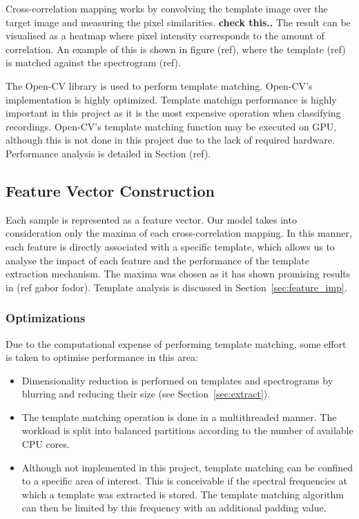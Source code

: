 Cross-correlation mapping works by convolving the template image
over the target image and measuring the pixel similarities.
\textbf{check this..}
The result can be visualised as a heatmap where pixel intensity corresponds to
the amount of correlation.
An example of this is shown in figure (ref), where the template (ref) is matched
against the spectrogram (ref).

The Open-CV library is used to perform template matching.
Open-CV's implementation is highly optimized.
Template matchign performance is highly important in this project as it is the
most expensive operation when classifying recordings.
Open-CV's template matching function may be executed on GPU, although this is
not done in this project due to the lack of required hardware.
Performance analysis is detailed in Section (ref).

\subsection{Feature Vector Construction}
Each sample is represented as a feature vector.
Our model takes into consideration only the maxima of each cross-correlation
mapping.
In this manner, each feature is directly associated with a specific template,
which allows us to analyse the impact of each feature and the performance of the
template extraction mechanism.
The maxima was chosen as it has shown promising results in (ref gabor fodor).
Template analysis is discussed in Section~\ref{sec:feature_imp}.

\subsubsection{Optimizations}
Due to the computational expense of performing template matching, some effort is
taken to optimise performance in this area:

\begin{itemize}
  \item Dimensionality reduction is performed on templates and spectrograms by
blurring and reducing their size (see Section~\ref{sec:extract}).

  \item The template matching operation is done in a multithreaded manner.
The workload is split into balanced partitions according to the number of
available CPU cores.

  \item Although not implemented in this project, template matching can be
confined to a specific area of interest.
This is conceivable if the spectral frequencies at which a template was extracted
is stored.
The template matching algorithm can then be limited by this frequency with an
additional padding value.
\end{itemize}

